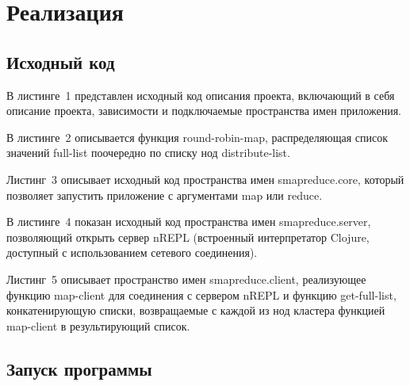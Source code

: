 \documentclass[document.tex]{subfiles}
\begin{document}
\newpage

\section{Реализация}
\subsection{Исходный код}
\begin{flushleft}
  В листинге~1 представлен исходный код описания проекта, включающий в себя
  описание проекта, зависимости и подключаемые пространства имен приложения.
  
\end{flushleft}

\begin{flushleft}
  В листинге~2 описывается функция round-robin-map, распределяющая список
  значений full-list поочередно по списку нод distribute-list.
  
\end{flushleft}

\begin{flushleft}
  Листинг~3 описывает исходный код пространства имен smapreduce.core, который
  позволяет запустить приложение с аргументами map или reduce.
  
\end{flushleft}

\begin{flushleft}
  В листинге~4 показан исходный код пространства имен smapreduce.server,
  позволяющий открыть сервер nREPL (встроенный интерпретатор Clojure, доступный
  с использованием сетевого соединения).
  
\end{flushleft}

\begin{flushleft}
  Листинг~5 описывает пространство имен smapreduce.client, реализующее функцию
  map-client для соединения с сервером nREPL и функцию get-full-list,
  конкатенирующую списки, возвращаемые с каждой из нод кластера функцией
  map-client в результирующий список.
  
\end{flushleft}

\newpage
\subsection{Запуск программы}
\lstset{language=Bash}
\end{document}
